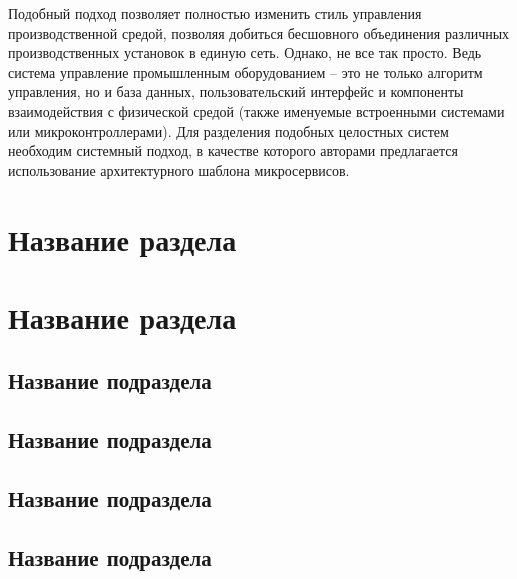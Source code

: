 Подобный подход позволяет полностью изменить стиль управления производственной средой, позволяя добиться бесшовного объединения различных производственных установок в единую сеть. Однако, не все так просто. Ведь система управление промышленным оборудованием – это не только алгоритм управления, но и база данных, пользовательский интерфейс и компоненты взаимодействия с физической средой (также именуемые встроенными системами или микроконтроллерами). Для разделения подобных целостных систем необходим системный подход, в качестве которого авторами предлагается использование архитектурного шаблона микросервисов.


\section{Название раздела}\label{sec:ch3/sec2}

\section{Название раздела}\label{sec:ch3/sec3}

\subsection{Название подраздела}\label{subsec:ch3/sec3/sub1}

\subsection{Название подраздела}\label{subsec:ch3/sec3/sub2}

\subsection{Название подраздела}\label{subsec:ch3/sec3/sub3}

\subsection{Название подраздела}\label{subsec:ch3/sec3/sub4}

\FloatBarrier